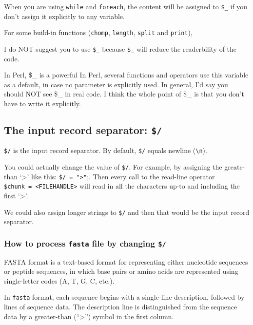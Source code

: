 \documentclass[]{book}
\theoremstyle{definition}
\theoremstyle{definition}
\theoremstyle{definition}
\theoremstyle{remark}
\begin{document}
When you are using \texttt{while} and \texttt{foreach}, the content will
be assigned to \texttt{\$\_} if you don't assign it explicitly to any
variable.

For some build-in functions (\texttt{chomp}, \texttt{length},
\texttt{split} and \texttt{print}),

I do NOT suggest you to use \texttt{\$\_} because \texttt{\$\_} will
reduce the readerbility of the code.

In Perl, \$\_ is a powerful In Perl, several functions and operators use
this variable as a default, in case no parameter is explicitly used. In
general, I'd say you should NOT see \$\_ in real code. I think the whole
point of \$\_ is that you don't have to write it explicitly.

\subsection{\texorpdfstring{The input record separator:
\texttt{\$/}}{The input record separator: \$/}}\label{the-input-record-separator}

\texttt{\$/} is the input record separator. By default, \texttt{\$/}
equals newline (\texttt{\textbackslash{}n}).

You could actually change the value of \texttt{\$/}. For example, by
assigning the greate-than `\textgreater{}' like this:
\texttt{\$/\ =\ "\textgreater{}"};. Then every call to the read-line
operator \texttt{\$chunk\ =\ \textless{}FILEHANDLE\textgreater{}} will
read in all the characters up-to and including the first
`\textgreater{}'.

We could also assign longer strings to \texttt{\$/} and then that would
be the input record separator.

\subsubsection{\texorpdfstring{How to process \texttt{fasta} file by
changing
\texttt{\$/}}{How to process fasta file by changing \$/}}\label{how-to-process-fasta-file-by-changing}

FASTA format is a text-based format for representing either nucleotide
sequences or peptide sequences, in which base pairs or amino acids are
represented using single-letter codes (A, T, G, C, etc.).

In \texttt{fasta} format, each sequence begins with a single-line
description, followed by lines of sequence data. The description line is
distinguished from the sequence data by a greater-than
(``\textgreater{}'') symbol in the first column.
\end{document}
